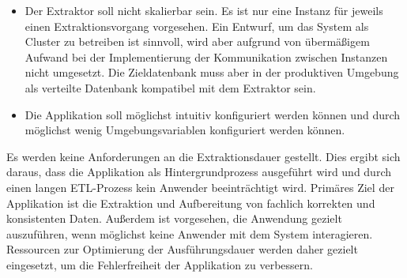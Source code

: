 \begin{itemize}
  \item Der Extraktor soll nicht skalierbar sein. Es ist nur eine Instanz für jeweils einen Extraktionsvorgang vorgesehen. Ein Entwurf, um das System als Cluster zu betreiben ist sinnvoll, wird aber aufgrund von übermäßigem Aufwand bei der Implementierung der Kommunikation zwischen Instanzen nicht umgesetzt. Die Zieldatenbank muss aber in der produktiven Umgebung als verteilte Datenbank kompatibel mit dem Extraktor sein.
  \item Die Applikation soll möglichst intuitiv konfiguriert werden können und durch möglichst wenig Umgebungsvariablen konfiguriert werden können.
\end{itemize}
Es werden keine Anforderungen an die Extraktionsdauer gestellt. Dies ergibt sich daraus, dass die Applikation als Hintergrundprozess ausgeführt wird und durch einen langen ETL-Prozess kein Anwender beeinträchtigt wird. Primäres Ziel der Applikation ist die Extraktion und Aufbereitung von fachlich korrekten und konsistenten Daten. Außerdem ist vorgesehen, die Anwendung gezielt auszuführen, wenn möglichst keine Anwender mit dem System interagieren. Ressourcen zur Optimierung der Ausführungsdauer werden daher gezielt eingesetzt, um die Fehlerfreiheit der Applikation zu verbessern.
